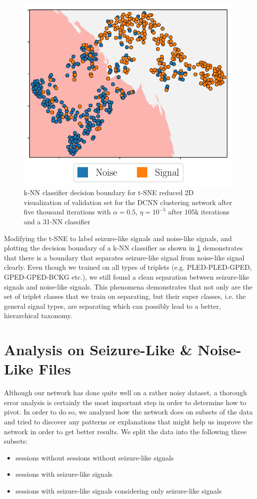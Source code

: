 \begin{figure}[!ht]
	\centering
	\includegraphics[width=0.55\linewidth]{pictures/tsne_plot_binary.pdf}
	\caption[k-NN Binary Decision Boundary on t-SNE Reduced Embedding]{k-NN classifier decision boundary for t-SNE reduced 2D visualization of validation set for the DCNN clustering network after five thousand iterations with $\alpha = 0.5$, $\eta = 10^{-5}$ after $105$k iterations and a 31-NN classifier}\label{fig:tsne_plot_binary}  
\end{figure}

Modifying the t-SNE to label seizure-like signals and noise-like signals, and plotting the decision boundary of a k-NN classifier as shown in \cref{fig:tsne_plot_binary} demonstrates that there is a boundary that separates seizure-like signal from noise-like signal clearly. Even though we trained on all types of triplets (e.g. PLED-PLED-GPED, GPED-GPED-BCKG etc.), we still found a clean separation between seizure-like signals and noise-like signals. This phenomena demonstrates that not only are the set of triplet classes that we train on separating, but their super classes, i.e. the general signal types, are separating which can possibly lead to a better, hierarchical taxonomy. 



\section{Analysis on Seizure-Like \& Noise-Like Files}
\label{analysis}
Although our network has done quite well on a rather noisy dataset, a thorough error analysis is certainly the most important step in order to determine how to pivot. In order to do so, we analyzed how the network does on subsets of the data and tried to discover any patterns or explanations that might help us improve the network in order to get better results. We split the data into the following three subsets: 
\begin{itemize}
	\setlength\itemsep{1mm}
	\item sessions without sessions without seizure-like signals
	\item sessions with seizure-like signals
  	\item sessions with seizure-like signals considering only seizure-like signals
\end{itemize}
   
